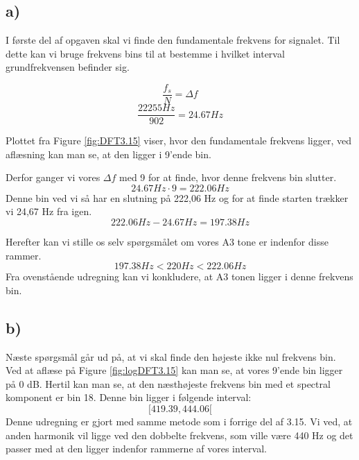 \documentclass[../main.tex]{subfiles}
\begin{document}
\subsection{a)}
I første del af opgaven skal vi finde den fundamentale frekvens for signalet.
Til dette kan vi bruge frekvens bins til at bestemme i hvilket interval grundfrekvensen befinder sig.

\[
    \frac{f_s}{N} = \Delta f
\]
\[
    \frac{22255 Hz}{902} = 24.67 Hz
\]

Plottet fra Figure \ref{fig:DFT3.15} viser, hvor den fundamentale frekvens ligger, ved aflæsning kan man se, at den ligger i 9'ende bin.

Derfor ganger vi vores $\Delta f$ med 9 for at finde, hvor denne frekvens bin slutter.
\[
    24.67 Hz \cdot 9 = 222.06 Hz
\]
Denne bin ved vi så har en slutning på 222,06 Hz og for at finde starten trækker vi 24,67 Hz fra igen.
\[
    222.06 Hz - 24.67 Hz = 197.38 Hz
\]

Herefter kan vi stille os selv spørgsmålet om vores A3 tone er indenfor disse rammer.
\[
    197.38 Hz < 220 Hz < 222.06 Hz
\]
Fra ovenstående udregning kan vi konkludere, at A3 tonen ligger i denne frekvens bin.

\subsection{b)}
Næste spørgsmål går ud på, at vi skal finde den højeste ikke nul frekvens bin.
Ved at aflæse på Figure \ref{fig:logDFT3.15} kan man se, at vores 9'ende bin ligger på 0 dB. Hertil kan man se, at den næsthøjeste
frekvens bin med et spectral komponent er bin 18. Denne bin ligger i følgende interval: 
\[[419.39 , 444.06[\] 
Denne udregning er gjort med samme metode som i forrige del af 3.15.
Vi ved, at anden harmonik vil ligge ved den dobbelte frekvens, som ville være 440 Hz og det passer med at den ligger indenfor rammerne af vores interval.
\end{document}
